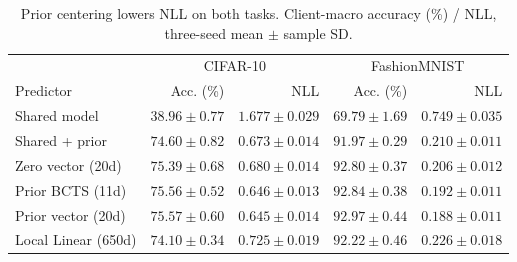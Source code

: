 \begin{table}[!htb]
\centering\small
\caption{Prior centering lowers NLL on both tasks. Client-macro accuracy (\%) / NLL, three-seed mean $\pm$ sample SD.}\label{tab:main}
\begin{tabular}{lrrrr}\toprule
& \multicolumn{2}{c}{CIFAR-10} & \multicolumn{2}{c}{FashionMNIST}\\
Predictor & Acc. (\%) & NLL & Acc. (\%) & NLL\\\midrule
Shared model & $38.96\pm0.77$ & $1.677\pm0.029$ & $69.79\pm1.69$ & $0.749\pm0.035$\\
Shared + prior & $74.60\pm0.82$ & $0.673\pm0.014$ & $91.97\pm0.29$ & $0.210\pm0.011$\\
Zero vector (20d) & $75.39\pm0.68$ & $0.680\pm0.014$ & $92.80\pm0.37$ & $0.206\pm0.012$\\
Prior BCTS (11d) & $75.56\pm0.52$ & $0.646\pm0.013$ & $92.84\pm0.38$ & $0.192\pm0.011$\\
Prior vector (20d) & $75.57\pm0.60$ & $0.645\pm0.014$ & $92.97\pm0.44$ & $0.188\pm0.011$\\
Local Linear (650d) & $74.10\pm0.34$ & $0.725\pm0.019$ & $92.22\pm0.46$ & $0.226\pm0.018$\\
\bottomrule
\end{tabular}
\end{table}

